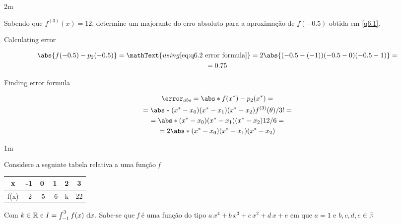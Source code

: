 \documentclass[CN_A-Tests_Resolutions.tex]{subfiles}
\begin{document}
\begin{questionBox}2m{} %

  Sabendo que \(f^{(3)}(x) = 12\), determine um majorante do erro absoluto para a aproximação de \(f(-0.5)\) obtida em \ref{q6.1}.

  \answer{\eqref{eq:q6.2 answer}}

  Calculating error
  \begin{tcolorbox}
    \begin{gather}
      \abs{f(-0.5)-p_2(-0.5)}
      = \mathText{using \eqref{eq:q6.2 error formula}}
      = 2\abs{
        (-0.5-(-1))
        (-0.5-0)
        (-0.5-1)
      }
      = \\
      = 0.75
      \label{eq:q6.2 answer}
    \end{gather}
  \end{tcolorbox}

  Finding error formula
  \begin{tcolorbox}
    \begin{gather}
      \error_{abs}
      = \abs*{f(x^*)-p_2(x^*)}
      = \\
      = \abs*{
        (x^*-x_0)
        (x^*-x_1)
        (x^*-x_2)
        f^{(3)}(\theta)/3!
      }
      = \\
      = \abs*{
        (x^*-x_0)
        (x^*-x_1)
        (x^*-x_2)
        12/6
      }
      = \\
      = 2\abs*{
        (x^*-x_0)
        (x^*-x_1)
        (x^*-x_2)
      }
      \label{eq:q6.2 error formula}
    \end{gather}
  \end{tcolorbox}
  
\end{questionBox}


\begin{questionBox}1m{} %

  Considere a seguinte tabela relativa a uma função \textit{f}
  \begin{center}
    \vspace{1ex}
    \begin{tabular}{C | *{5}{C}}
      x 
      & -1 & 0 & 1 & 2 & 3
      \\\hline
      f(x)
      & -2 & -5 & -6 & k & 22
    \end{tabular}
    \vspace{2ex}
  \end{center}
  Com \(k\in\mathbb{R}\text{ e }I=\int_{-1}^3{f(x)\,\odif{x}}\).
  Sabe-se que \textit{f} é uma função do tipo \(a\,x^4+b\,x^3+c\,x^2+d\,x+e\) em que \(a=1\text{ e }b,c,d,e\in\mathbb{R}\)

\end{questionBox}
\end{document}
